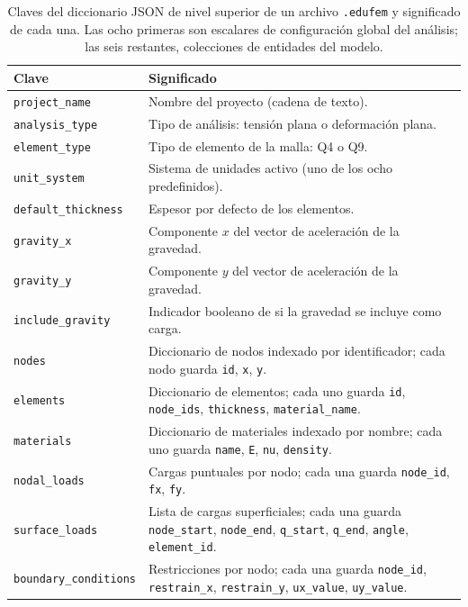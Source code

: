 \begin{table}[htbp]
\centering
\caption[Claves del diccionario JSON de un proyecto \texttt{.edufem}.]{Claves del diccionario JSON de nivel superior de un archivo \texttt{.edufem} y significado de cada una. Las ocho primeras son escalares de configuración global del análisis; las seis restantes, colecciones de entidades del modelo.}
\label{tab:edufem-claves}
\begin{tabular}{l p{9.2cm}}
\toprule
\textbf{Clave} & \textbf{Significado} \\
\midrule
\texttt{project\_name}       & Nombre del proyecto (cadena de texto). \\
\texttt{analysis\_type}      & Tipo de análisis: tensión plana o deformación plana. \\
\texttt{element\_type}       & Tipo de elemento de la malla: Q4 o Q9. \\
\texttt{unit\_system}        & Sistema de unidades activo (uno de los ocho predefinidos). \\
\texttt{default\_thickness}  & Espesor por defecto de los elementos. \\
\texttt{gravity\_x}          & Componente $x$ del vector de aceleración de la gravedad. \\
\texttt{gravity\_y}          & Componente $y$ del vector de aceleración de la gravedad. \\
\texttt{include\_gravity}    & Indicador booleano de si la gravedad se incluye como carga. \\
\texttt{nodes}               & Diccionario de nodos indexado por identificador; cada nodo guarda \texttt{id}, \texttt{x}, \texttt{y}. \\
\texttt{elements}            & Diccionario de elementos; cada uno guarda \texttt{id}, \texttt{node\_ids}, \texttt{thickness}, \texttt{material\_name}. \\
\texttt{materials}           & Diccionario de materiales indexado por nombre; cada uno guarda \texttt{name}, \texttt{E}, \texttt{nu}, \texttt{density}. \\
\texttt{nodal\_loads}        & Cargas puntuales por nodo; cada una guarda \texttt{node\_id}, \texttt{fx}, \texttt{fy}. \\
\texttt{surface\_loads}      & Lista de cargas superficiales; cada una guarda \texttt{node\_start}, \texttt{node\_end}, \texttt{q\_start}, \texttt{q\_end}, \texttt{angle}, \texttt{element\_id}. \\
\texttt{boundary\_conditions} & Restricciones por nodo; cada una guarda \texttt{node\_id}, \texttt{restrain\_x}, \texttt{restrain\_y}, \texttt{ux\_value}, \texttt{uy\_value}. \\
\bottomrule
\end{tabular}
\end{table}

